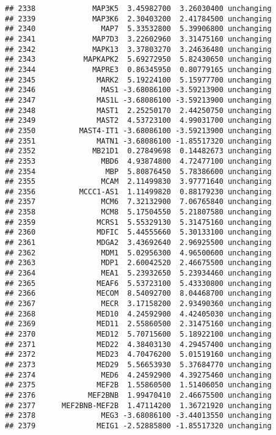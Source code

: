 \documentclass[]{article}
\begin{document}
\begin{verbatim}
## 2338             MAP3K5  3.45982700  3.26030400 unchanging
## 2339             MAP3K6  2.30403200  2.41784500 unchanging
## 2340               MAP7  5.33532800  5.39906800 unchanging
## 2341             MAP7D3  3.22602960  3.31475160 unchanging
## 2342             MAPK13  3.37803270  3.24636480 unchanging
## 2343           MAPKAPK2  5.69272950  5.82430650 unchanging
## 2344             MAPRE3  0.86345950  0.80779165 unchanging
## 2345              MARK2  5.19224100  5.15977700 unchanging
## 2346               MAS1 -3.68086100 -3.59213900 unchanging
## 2347              MAS1L -3.68086100 -3.59213900 unchanging
## 2348              MAST1  2.25250170  2.44250750 unchanging
## 2349              MAST2  4.53723100  4.99031700 unchanging
## 2350          MAST4-IT1 -3.68086100 -3.59213900 unchanging
## 2351              MATN1 -3.68086100 -1.85517320 unchanging
## 2352             MB21D1  0.27849698  0.14482673 unchanging
## 2353               MBD6  4.93874800  4.72477100 unchanging
## 2354                MBP  5.80876450  5.78386600 unchanging
## 2355               MCAM  2.11499830  3.97771640 unchanging
## 2356          MCCC1-AS1  1.11499820  0.88179230 unchanging
## 2357               MCM6  7.32132900  7.06765840 unchanging
## 2358               MCM8  5.17504550  5.21807580 unchanging
## 2359              MCRS1  5.55329130  5.31475160 unchanging
## 2360              MDFIC  5.44555660  5.30133100 unchanging
## 2361              MDGA2  3.43692640  2.96925500 unchanging
## 2362               MDM1  5.02956300  4.96500600 unchanging
## 2363               MDP1  2.60042520  2.46675500 unchanging
## 2364               MEA1  5.23932650  5.23934460 unchanging
## 2365              MEAF6  5.53723100  5.43330800 unchanging
## 2366              MECOM  8.54092700  8.04468700 unchanging
## 2367               MECR  3.17158200  2.93490360 unchanging
## 2368              MED10  4.24592900  4.42405030 unchanging
## 2369              MED11  2.55860500  2.31475160 unchanging
## 2370              MED12  5.70715600  5.18922100 unchanging
## 2371              MED22  4.38403130  4.29457400 unchanging
## 2372              MED23  4.70476200  5.01519160 unchanging
## 2373              MED29  5.56653930  5.37684770 unchanging
## 2374               MED6  4.24592900  4.39275460 unchanging
## 2375              MEF2B  1.55860500  1.51406050 unchanging
## 2376            MEF2BNB  1.99470410  2.46675500 unchanging
## 2377      MEF2BNB-MEF2B  1.47114200  1.36721920 unchanging
## 2378               MEG3 -3.68086100 -3.44013550 unchanging
## 2379              MEIG1 -2.52885800 -1.85517320 unchanging

\end{verbatim}
\end{document}
